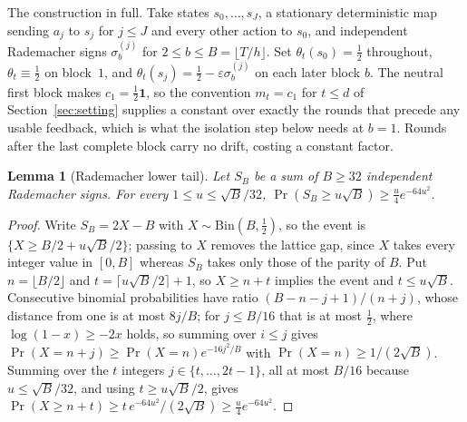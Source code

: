 \documentclass{article}
\newtheorem{lemma}{Lemma}
\theoremstyle{remark}
\begin{document}
The construction in full. Take states $s_0,\dots,s_J$, a stationary deterministic map sending
$a_j$ to $s_j$ for $j\le J$ and every other action to $s_0$, and independent Rademacher signs
$\sigma_b^{(j)}$ for $2\le b\le B=\lfloor T/h\rfloor$. Set $\theta_t(s_0)=\tfrac12$ throughout,
$\theta_t\equiv\tfrac12$ on block~$1$, and $\theta_t(s_j)=\tfrac12-\varepsilon\sigma_b^{(j)}$ on
each later block $b$. The neutral first block makes $c_1=\tfrac12\mathbf 1$, so the
convention $m_t=c_1$ for $t\le d$ of Section~\ref{sec:setting} supplies a constant over exactly
the rounds that precede any usable feedback, which is what the isolation step below needs at $b=1$. Rounds after the last complete block carry no drift, costing a constant factor.

\begin{lemma}[Rademacher lower tail]\label{lem:rade}
Let $S_B$ be a sum of $B\ge32$ independent Rademacher signs. For every $1\le u\le\sqrt B/32$,
$\Pr(S_B\ge u\sqrt B)\ge\tfrac u4e^{-64u^2}$.
\end{lemma}

\begin{proof}
Write $S_B=2X-B$ with $X\sim\mathrm{Bin}(B,\tfrac12)$, so the event is
$\{X\ge B/2+u\sqrt B/2\}$; passing to $X$ removes the lattice gap, since $X$ takes every integer
value in $[0,B]$ whereas $S_B$ takes only those of the parity of $B$. Put $n=\lfloor B/2\rfloor$
and $t=\lceil u\sqrt B/2\rceil+1$, so $X\ge n+t$ implies the event and $t\le u\sqrt B$.
Consecutive binomial probabilities have ratio $(B-n-j+1)/(n+j)$, whose distance from one is at
most $8j/B$; for $j\le B/16$ that is at most $\tfrac12$, where $\log(1-x)\ge-2x$ holds, so summing
over $i\le j$ gives $\Pr(X=n+j)\ge\Pr(X=n)e^{-16j^2/B}$ with $\Pr(X=n)\ge1/(2\sqrt B)$. Summing
over the $t$ integers $j\in\{t,\dots,2t-1\}$, all at most $B/16$ because $u\le\sqrt B/32$, and
using $t\ge u\sqrt B/2$, gives
$\Pr(X\ge n+t)\ge t\,e^{-64u^2}/(2\sqrt B)\ge\tfrac u4e^{-64u^2}$.
\end{proof}
\end{document}
